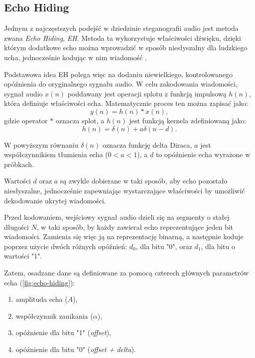 \subsection{Echo Hiding}

Jednym z najczęstszych podejść w dziedzinie steganografii audio jest metoda zwana \textit{Echo Hiding}, \textit{EH}. Metoda ta wykorzystuje właściwości dźwięku, dzięki którym dodatkowe echo można wprowadzić w sposób niesłyszalny dla ludzkiego ucha, jednocześnie kodując w nim wiadomość \cite{Gruhl1996EchoH}.

Podstawowa idea EH polega więc na dodaniu niewielkiego, kontrolowanego opóźnienia do oryginalnego sygnału audio. W celu zakodowania wiadomości, sygnał audio $x(n)$ poddawany jest operacji splotu z funkcją impulsową $h(n)$, która definiuje właściwości echa. Matematycznie proces ten można zapisać jako:
\begin{equation}
	y(n) = h(n) * x(n),
\end{equation}
gdzie operator $*$ oznacza splot, a $h(n)$ jest funkcją kernela zdefiniowaną jako:
\begin{equation}
	h(n) = \delta(n) + a \delta(n-d).
\end{equation}

W powyższym równaniu $\delta(n)$ oznacza funkcję delta Diraca, $a$ jest współczynnikiem tłumienia echa ($0 < a < 1$), a $d$ to opóźnienie echa wyrażone w próbkach.

Wartości $d$ oraz $a$ są zwykle dobierane w taki sposób, aby echo pozostało niesłyszalne, jednocześnie zapewniając wystarczające właściwości by umożliwić dekodowanie ukrytej wiadomości.

Przed kodowaniem, wejściowy sygnał audio dzieli się na segmenty o stałej długości $N$, w taki sposób, by każdy zawierał echo reprezentujące jeden bit wiadomości. Zamienia się więc ją na reprezentację binarną, a następnie koduje poprzez użycie dwóch różnych opóźnień: $d_0$, dla bitu "0", oraz $d_1$, dla bitu o wartości "1".

Zatem, osadzane dane są definiowane za pomocą czterech głównych parametrów echa (\ref{fig:echo-hiding}):
\begin{enumerate}
	\item amplituda echa ($A$),
	\item współczynnik zanikania ($\alpha$),
	\item opóźnienie dla bitu "1" (\textit{offset}),
	\item opóźnienie dla bitu "0" (\textit{offset + delta}).
\end{enumerate}

